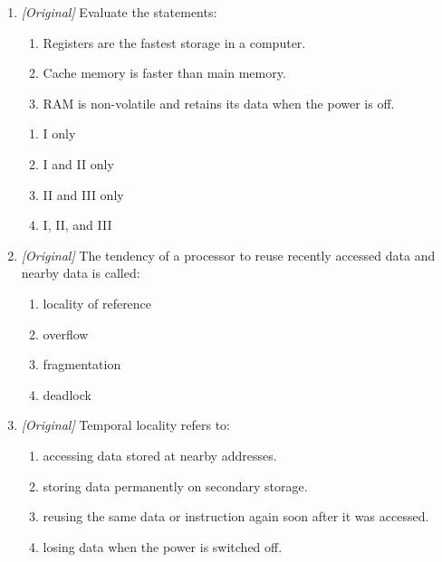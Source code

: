 \documentclass[11pt]{article}
\begin{document}
\begin{enumerate}[label=\textbf{Q\arabic*.}, leftmargin=*]
  \begin{enumerate}[label=\Alph*.]
    \item Faster memory is smaller and more expensive per bit, so the
      hierarchy balances speed, cost, and capacity.
    \item All memory types have the same speed and cost.
    \item Secondary storage is the fastest type of memory.
    \item Registers can store the entire contents of main memory.
  \end{enumerate}
\item \textit{[Original]} Evaluate the statements:
  \begin{enumerate}[label=\Roman*.]
    \item Registers are the fastest storage in a computer.
    \item Cache memory is faster than main memory.
    \item RAM is non-volatile and retains its data when the power is off.
  \end{enumerate}
  \begin{enumerate}[label=\Alph*.]
    \item I only
    \item I and II only
    \item II and III only
    \item I, II, and III
  \end{enumerate}
\item \textit{[Original]} The tendency of a processor to reuse recently
  accessed data and nearby data is called:
  \begin{enumerate}[label=\Alph*.]
    \item locality of reference
    \item overflow
    \item fragmentation
    \item deadlock
  \end{enumerate}
\item \textit{[Original]} Temporal locality refers to:
  \begin{enumerate}[label=\Alph*.]
    \item accessing data stored at nearby addresses.
    \item storing data permanently on secondary storage.
    \item reusing the same data or instruction again soon after it was
      accessed.
    \item losing data when the power is switched off.

\end{enumerate}
\end{enumerate}
\end{document}
